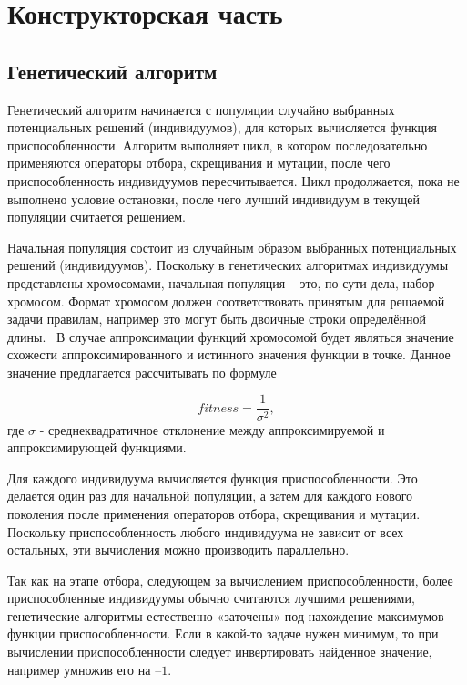 \chapter{Конструкторская часть}

\section{Генетический алгоритм}

Генетический алгоритм начинается с популяции случайно выбранных потенциальных решений (индивидуумов), для которых вычисляется функция приспособленности. Алгоритм выполняет цикл, в котором последовательно применяются операторы отбора, скрещивания и мутации, после чего приспособленность индивидуумов пересчитывается. Цикл продолжается, пока не выполнено условие остановки, после чего лучший индивидуум в текущей популяции считается решением.~\cite{book1}

Начальная популяция состоит из случайным образом выбранных потенциальных решений (индивидуумов). Поскольку в генетических алгоритмах индивидуумы представлены хромосомами, начальная популяция – это, по сути дела, набор хромосом. Формат хромосом должен соответствовать принятым для решаемой задачи правилам, например это могут быть двоичные строки определённой длины.~\cite{book1} В случае аппроксимации функций хромосомой будет являться значение схожести аппроксимированного и истинного значения функции в точке. Данное значение предлагается рассчитывать по формуле

\label{fitness}
\begin{equation}
	fitness = \frac{1}{\sigma^2},
\end{equation}
где $\sigma$ - среднеквадратичное отклонение между аппроксимируемой и
аппроксимирующей функциями.

Для каждого индивидуума вычисляется функция приспособленности. Это делается один раз для начальной популяции, а затем для каждого нового поколения после применения операторов отбора, скрещивания и мутации. Поскольку приспособленность любого индивидуума не зависит от всех остальных, эти вычисления можно производить параллельно.~\cite{book1}

Так как на этапе отбора, следующем за вычислением приспособленности, более приспособленные индивидуумы обычно считаются лучшими решениями, генетические алгоритмы естественно «заточены» под нахождение максимумов функции приспособленности. Если в какой-то задаче нужен минимум, то при вычислении приспособленности следует инвертировать найденное значение, например умножив его на $–1$.~\cite{book1}

